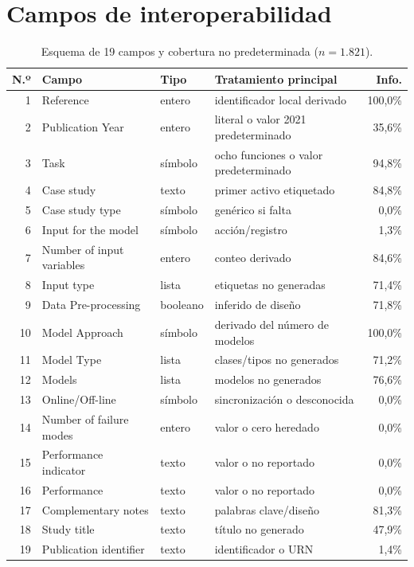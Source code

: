 \documentclass[11pt,a4paper]{article}
\begin{document}
\appendix
\section{Campos de interoperabilidad}
\label{app:fields}
\begin{table}[ht]
\centering
\caption{Esquema de 19 campos y cobertura no predeterminada ($n=1.821$).}
\footnotesize
\begin{tabularx}{\linewidth}{rllXr}
\toprule
N.º & Campo & Tipo & Tratamiento principal & Info. \\
\midrule
1 & Reference & entero & identificador local derivado & 100,0\% \\
2 & Publication Year & entero & literal o valor 2021 predeterminado & 35,6\% \\
3 & Task & símbolo & ocho funciones o valor predeterminado & 94,8\% \\
4 & Case study & texto & primer activo etiquetado & 84,8\% \\
5 & Case study type & símbolo & genérico si falta & 0,0\% \\
6 & Input for the model & símbolo & acción/registro & 1,3\% \\
7 & Number of input variables & entero & conteo derivado & 84,6\% \\
8 & Input type & lista & etiquetas no generadas & 71,4\% \\
9 & Data Pre-processing & booleano & inferido de diseño & 71,8\% \\
10 & Model Approach & símbolo & derivado del número de modelos & 100,0\% \\
11 & Model Type & lista & clases/tipos no generados & 71,2\% \\
12 & Models & lista & modelos no generados & 76,6\% \\
13 & Online/Off-line & símbolo & sincronización o desconocida & 0,0\% \\
14 & Number of failure modes & entero & valor o cero heredado & 0,0\% \\
15 & Performance indicator & texto & valor o no reportado & 0,0\% \\
16 & Performance & texto & valor o no reportado & 0,0\% \\
17 & Complementary notes & texto & palabras clave/diseño & 81,3\% \\
18 & Study title & texto & título no generado & 47,9\% \\
19 & Publication identifier & texto & identificador o URN & 1,4\% \\
\bottomrule
\end{tabularx}
\end{table}

\FloatBarrier


\end{document}
